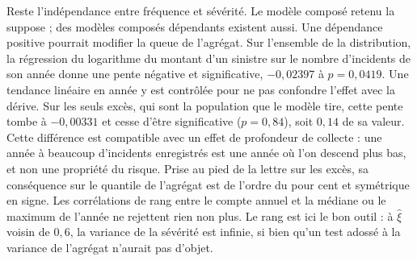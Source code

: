 Reste l'indépendance entre fréquence et sévérité. Le modèle composé retenu la suppose ; des modèles composés dépendants existent aussi.
Une dépendance positive pourrait modifier la queue de l'agrégat. Sur l'ensemble de la distribution, la
régression du logarithme du montant d'un sinistre sur le nombre d'incidents de son année donne une pente négative
et significative, $-0{,}02397$ à $p = 0{,}0419$. Une tendance linéaire en année y est contrôlée pour ne pas confondre l'effet avec
la dérive. Sur les seuls excès, qui sont la population que le modèle tire, cette pente tombe à $-0{,}00331$ et cesse
d'être significative ($p = 0{,}84$), soit $0{,}14$ de sa valeur. Cette différence est compatible avec un effet de profondeur de collecte : une année à beaucoup d'incidents enregistrés est une année où l'on
descend plus bas, et non une propriété du risque. Prise au pied de la lettre sur les excès, sa conséquence sur le
quantile de l'agrégat est de l'ordre du pour cent et symétrique en signe. Les corrélations de rang entre le compte
annuel et la médiane ou le maximum de l'année ne rejettent rien non plus. Le rang est ici le bon outil : à
$\hat\xi$ voisin de $0{,}6$, la variance de la sévérité est infinie, si bien qu'un test adossé à la variance de
l'agrégat n'aurait pas d'objet.
